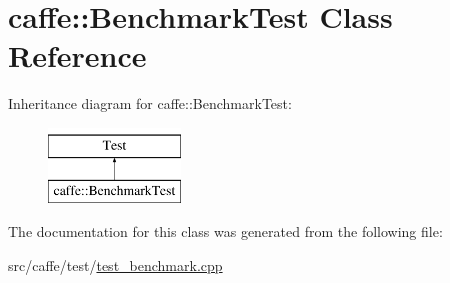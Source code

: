 \hypertarget{classcaffe_1_1_benchmark_test}{\section{caffe\+:\+:Benchmark\+Test Class Reference}
\label{classcaffe_1_1_benchmark_test}
}
Inheritance diagram for caffe\+:\+:Benchmark\+Test\+:\begin{figure}[H]
\begin{center}
\leavevmode
\includegraphics[height=2.000000cm]{classcaffe_1_1_benchmark_test}
\end{center}
\end{figure}


The documentation for this class was generated from the following file\+:\begin{DoxyCompactItemize}
\item 
src/caffe/test/\hyperlink{test__benchmark_8cpp}{test\+\_\+benchmark.\+cpp}\end{DoxyCompactItemize}
